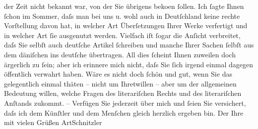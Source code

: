 \begin{ledgroupsized}[t]{13cm}
                    der Zeit nicht bekannt war, von der Sie
                    übrigens \label{K_L00602_1v}\label{K_L00602_1h} beko{\geminationm}en ſollen. Ich ſagte Ihnen ſchon im Sommer, daſs
                    man bei uns u. wohl auch in Deutſchland keine
                    rechte Vorſtellung davon hat, in welcher Art Überſetzungen Ihrer Werke
                    verfertigt und in welcher Art ſie ausgenutzt werden. Vielfach iſt ſogar die
                    Anſicht verbreitet, daſs Sie selbſt auch deutſche Artikel ſchreiben und manche
                    Ihrer Sachen ſelbſt aus dem däniſchen ins
                    deutſche übertragen.\pend
           \pstart
           {\pb}All dies ſcheint Ihnen zuweilen doch
                    ärgerlich zu ſein; aber ich erinnere mich nicht, daſs Sie ſich irgend einmal
                    dagegen öffentlich verwahrt haben.\pend
           \pstart
           Wäre es nicht doch ſchön und gut, wenn Sie das gelegentlich einmal thäten – nicht
                    um Ihretwillen – aber um der allgemeinen Bedeutung willen, welche Fragen des
                    literariſchen Rechts und des literariſchen Anſtands zukommt. –\pend
           \pstart
           Verfügen Sie jederzeit über mich und ſeien Sie versichert, daſs ich dem Künſtler
                    und dem Menſchen gleich herzlich ergeben bin.\pend
           \pstart Der Ihre mit vielen Grüßen \spacefill\mbox{ArtSchnitzler}\pend{}          \endnumbering{}\end{ledgroupsized}  \newcommand{\dateiname}{L00602}\newcommand{\titel}{Arthur Schnitzler an Georg Brandes, 8. 10. 1896}\newcommand{\editorInnen}{Martin Anton Müller und Gerd-Hermann Susen}
            \footnotesize
\begin{ledgroupsized}[t]{11.5cm}
\end{ledgroupsized}
         
      